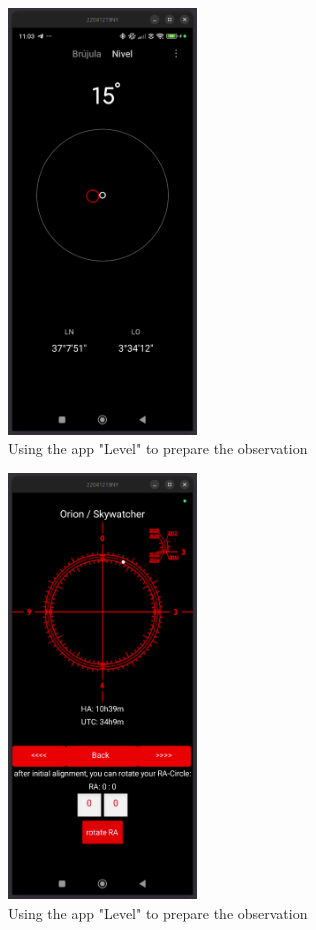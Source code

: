 \documentclass[a4paper,landscape,english,12pt]{article}
\begin{document}
\begin{figure}[hbt]
	\includegraphics[width=5cm]{../Figures/level.jpg}
	\caption{Using the app "Level" to prepare the observation}		
	\label{fig:level}
\end{figure} 

\begin{figure}[hbt]
	\includegraphics[width=5cm]{../Figures/polarallignment.jpg}
	\caption{Using the app "Level" to prepare the observation}		
	\label{fig:polaralign}
\end{figure} 
\end{document}
